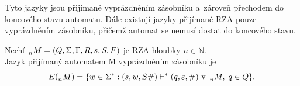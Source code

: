 Tyto jazyky jsou přijímané vyprázdněním zásobníku a~zároveň přechodem do koncového stavu automatu.
Dále existují jazyky přijímané RZA pouze vyprázdněním zásobníku, přičemž automat se nemusí dostat do koncového stavu.

\begin{definition}\label{def_jazyk_rza_empty}
    Nechť $\prescript{}{n}{M} = (Q, \Sigma, \Gamma, R, s, S, F)$ je RZA hloubky $n \in \mathbb{N}$. \\
    Jazyk přijímaný automatem M vyprázdněním zásobníku je
    \begin{equation*}
        E(\prescript{}{n}{M}) = \{w \in \Sigma^* : (s, w, S\#) \vdash^* (q, \varepsilon, \#) \text{ v~}\prescript{}{n}{M},\; q \in Q\}.
    \end{equation*}
\end{definition}

